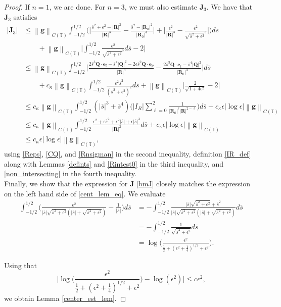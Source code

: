 \documentclass[11pt]{article}
\numberwithin{equation}{section}
\newcommand{\T}{\mathbb{T}}
\newcommand{\bars}{\overline s}
\newcommand{\be}{\bm{e}}
\newcommand{\abs}[1]{\left\lvert #1 \right\rvert}
\newcommand{\norm}[1]{\left\lVert #1 \right\rVert}
\theoremstyle{definition}
\begin{document}
\begin{proof}
If $n=1$, we are done. For $n=3$, we must also estimate $\bm{J}_3$. We have that $\bm{J}_3$ satisfies 
\begin{align*}
\abs{\bm{J}_3} &\le \norm{\bm{g}}_{C(\T)}\int_{-1/2}^{1/2} \bigg( \bigg|\frac{\bars^2+\epsilon^2-\abs{\bm{R}}^2}{\abs{\bm{R}}^3} - \frac{\bars^2-\abs{\bm{R}_0}^2}{\abs{\bm{R}_0}^3}\bigg| +\bigg|\frac{\epsilon^2}{\abs{\bm{R}}^3} - \frac{\epsilon^2}{\sqrt{\bars^2+\epsilon^2}^3} \bigg|  \bigg) d\bars \\
&\qquad + \norm{\bm{g}}_{C(\T)}\bigg|\int_{-1/2}^{1/2} \frac{\epsilon^2}{\sqrt{\bars^2+\epsilon^2}^3}d\bars - 2 \bigg| \\
%
&\le \norm{\bm{g}}_{C(\T)}\int_{-1/2}^{1/2} \bigg|\frac{2\bars^3\bm{Q}\cdot\be_t-\bars^4\abs{\bm{Q}}^2-2\epsilon\bars^2\bm{Q}\cdot\be_\rho}{\abs{\bm{R}}^3} - \frac{2\bars^3\bm{Q}\cdot\be_t-\bars^4\abs{\bm{Q}}^2}{\abs{\bm{R}_0}^3} \bigg| d\bars \\
&\qquad +c_\kappa \norm{\bm{g}}_{C(\T)}\int_{-1/2}^{1/2} \frac{\epsilon^2\bars^2}{(\bars^2+\epsilon^2)^2} d\bars  + \norm{\bm{g}}_{C(\T)}\bigg|\frac{2}{\sqrt{1+4\epsilon^2}} - 2 \bigg| \\
%
&\le c_\kappa\norm{\bm{g}}_{C(\T)}\int_{-1/2}^{1/2} (|\bars|^3+\bars^4)\bigg(\abs{I_R} \sum_{\ell=0}^2\frac{1}{\abs{\bm{R}_0}^\ell\abs{\bm{R}}^{2-\ell}}  \bigg) d\bars+c_\kappa \epsilon \abs{\log\epsilon} \norm{\bm{g}}_{C(\T)} \\
%
&\le c_\kappa\norm{\bm{g}}_{C(\T)}\int_{-1/2}^{1/2} \frac{\epsilon^2+\epsilon\bars^2 + \epsilon^2|\bars|+\epsilon|\bars|^3}{\abs{\bm{R}}^2} d\bars+c_\kappa \epsilon \abs{\log\epsilon} \norm{\bm{g}}_{C(\T)} \\ 
%
&\le c_\kappa \epsilon \abs{\log\epsilon} \norm{\bm{g}}_{C(\T)},
\end{align*}
using \eqref{Reps}, \eqref{CQ}, and \eqref{Rnsigman} in the second inequality, definition \ref{IR_def} along with Lemmas \ref{defints} and \ref{Rintest0} in the third inequality, and \eqref{non_intersecting} in the fourth inequality. \\

Finally, we show that the expression for $\bm{J}$ \eqref{bmJ} closely matches the expression on the left hand side of \eqref{cent_lem_eq}. We evaluate
\begin{align*}
\int_{-1/2}^{1/2}\bigg(\frac{\epsilon^2}{\abs{\bars}\sqrt{\bars^2+\epsilon^2} (\abs{\bars}+\sqrt{\bars^2+\epsilon^2})} -\frac{1}{\abs{\bars}} \bigg) d\bars &= -\int_{-1/2}^{1/2}\frac{\abs{\bars}\sqrt{\bars^2+\epsilon^2}+\bars^2}{\abs{\bars}\sqrt{\bars^2+\epsilon^2} (\abs{\bars}+\sqrt{\bars^2+\epsilon^2})} d\bars \\
&= -\int_{-1/2}^{1/2}\frac{1}{\sqrt{\bars^2+\epsilon^2} } d\bars \\
&= \log\bigg(\frac{\epsilon^2}{\frac{1}{2}+(\epsilon^2+\frac{1}{4})^{1/2}+\epsilon^2} \bigg).
\end{align*}

Using that 
\[ \bigg|\log\bigg(\frac{\epsilon^2}{\frac{1}{2}+(\epsilon^2+\frac{1}{4})^{1/2}+\epsilon^2}\bigg)  - \log(\epsilon^2)\bigg| \le c \epsilon^2, \]
we obtain Lemma \ref{center_est_lem}.
\end{proof}
\end{document}
